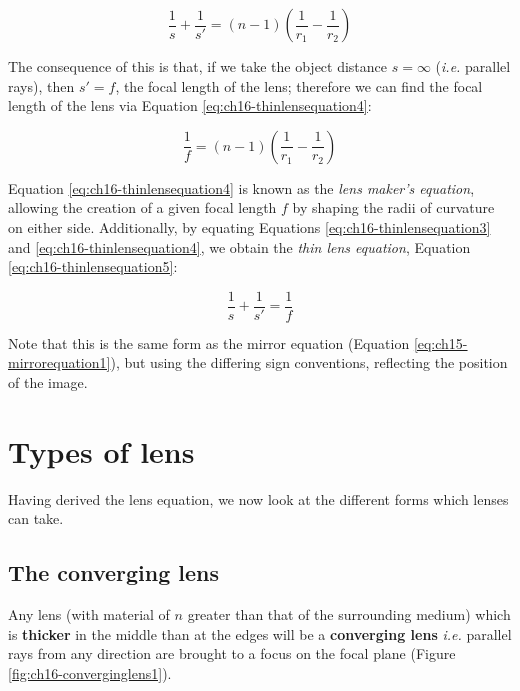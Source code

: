 \documentclass[
]{book}
\begin{document}
\begin{equation}
\frac{1}{s} + \frac{1}{s'} = (n-1)\left( \frac{1}{r_1} - \frac{1}{r_2}\right)
\label{eq:ch16-thinlensequation3}
\end{equation}

The consequence of this is that, if we take the object distance \(s = \infty\) (\emph{i.e.} parallel rays), then \(s' = f\), the focal length of the lens; therefore we can find the focal length of the lens via Equation \eqref{eq:ch16-thinlensequation4}:

\begin{equation}
\frac{1}{f} = (n-1) \left(  \frac{1}{r_1} - \frac{1}{r_2} \right)
\label{eq:ch16-thinlensequation4}
\end{equation}

Equation \eqref{eq:ch16-thinlensequation4} is known as the \emph{lens maker's equation}, allowing the creation of a given focal length \(f\) by shaping the radii of curvature on either side. Additionally, by equating Equations \eqref{eq:ch16-thinlensequation3} and \eqref{eq:ch16-thinlensequation4}, we obtain the \emph{thin lens equation}, Equation \eqref{eq:ch16-thinlensequation5}:

\begin{equation}
\frac{1}{s} + \frac{1}{s'} = \frac{1}{f}
\label{eq:ch16-thinlensequation5}
\end{equation}

Note that this is the same form as the mirror equation (Equation \eqref{eq:ch15-mirrorequation1}), but using the differing sign conventions, reflecting the position of the image.

\hypertarget{types-of-lens}{%
\section{Types of lens}\label{types-of-lens}}

Having derived the lens equation, we now look at the different forms which lenses can take.

\hypertarget{sec:ch16-converginglens1}{%
\subsection{The converging lens}\label{sec:ch16-converginglens1}}

Any lens (with material of \(n\) greater than that of the surrounding medium) which is \textbf{thicker} in the middle than at the edges will be a \textbf{converging lens} \emph{i.e.} parallel rays from any direction are brought to a focus on the focal plane (Figure \ref{fig:ch16-converginglens1}).
\end{document}
